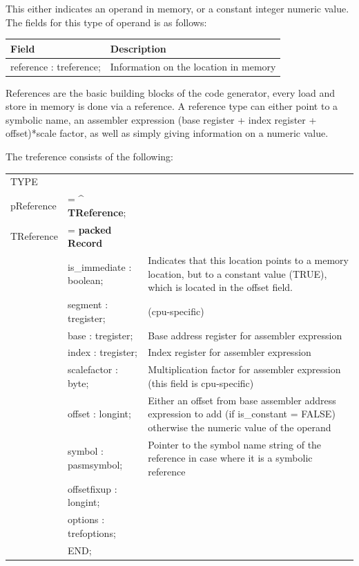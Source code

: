 \documentclass [a4paper,12pt]{article}
\begin{document}
This either indicates an operand in memory, or a constant integer numeric
value. The fields for this type of operand is as follows:

\begin{longtable}{|l|p{10cm}|}
\hline
Field   & Description \\
\hline
\endhead
\hline
\endfoot
\textsf{reference : treference;}&
    Information on the location in memory
\end{longtable}

References are the basic building blocks of the code generator, every load
and store in memory is done via a reference. A reference type can either
point to a symbolic name, an assembler expression (base register + index
register + offset)*scale factor, as well as simply giving information on a
numeric value.

The treference consists of the following:

\begin{tabular*}{6.5in}{|l@{\extracolsep{\fill}}lp{}|}
\hline
\textsf{TYPE} & & \\
\xspace \textsf{pReference} &= \^{} \textbf{TReference};&  \\
\xspace \textsf{TReference} &= \textbf{packed Record} & \\
&\textsf{is{\_}immediate : boolean;}&
    Indicates that this location points to a memory location, but to a
    constant value (TRUE), which is located in the offset field. \\
&\textsf{segment : tregister;}& (cpu-specific) \\
&\textsf{base : tregister;}&
    Base address register for assembler expression \\
&\textsf{index : tregister;}&
    Index register for assembler expression \\
&\textsf{scalefactor : byte;}&
    Multiplication factor for assembler expression (this field is
    cpu-specific) \\
&\textsf{offset : longint;}&
    Either an offset from base assembler address expression to add (if
    is{\_}constant = FALSE) otherwise the numeric value of the operand \\
&\textsf{symbol : pasmsymbol;}&
    Pointer to the symbol name string of the reference in case where it is
    a symbolic reference \\
&\textsf{offsetfixup : longint;}&  \\
&\textsf{options : trefoptions;}&  \\
&\textsf{END;}&  \\
\hline
\end{tabular*}
\end{document}
